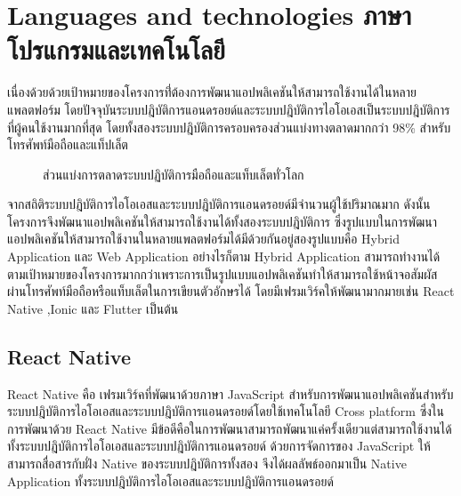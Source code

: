 \documentclass[12pt,oneside,openright,a4paper]{cpe-thai-project}
\begin{document}
\section{Languages and technologies  ภาษาโปรแกรมและเทคโนโลยี}
เนื่องด้วยด้วยเป้าหมายของโครงการที่่ต้องการพัฒนาแอปพลิเคชันให้สามารถใช้งานได้ในหลายแพลตฟอร์ม 
โดยปัจจุบันระบบปฎิบัติการแอนดรอยด์และระบบปฎิบัติการไอโอเอสเป็นระบบปฎิบัติการที่ผู้คนใช้งานมากที่สุด 
โดยทั้งสองระบบปฎิบัติการครอบครองส่วนแบ่งทางตลาดมากกว่า 98\%  สำหรับโทรศัพท์มือถือและแท็ปเล็ต
\begin{figure}[!ht]\centering
  \setlength{\fboxrule}{0.2mm} %
  \setlength{\fboxsep}{1cm}
  \caption{ส่วนแบ่งการตลาดระบบปฏิบัติการมือถือและแท็บเล็ตทั่วโลก}\label{fig:market}
\end{figure}
จากสถิติระบบปฎิบัติการไอโอเอสและระบบปฎิบัติการแอนดรอยด์มีจำนวนผู้ใช้ปริมาณมาก ดังนั้นโครงการจึงพัฒนาแอปพลิเคชันให้สามารถใช้งานได้ทั้งสองระบบปฎิบัติการ 
ซึ่งรูปแบบในการพัฒนาแอปพลิเคชันให้สามารถใช้งานในหลายแพลตฟอร์มได้มีด้วยกันอยู่สองรูปแบบคือ Hybrid Application และ Web Application อย่างไรก็ตาม Hybrid Application 
สามารถทำงานได้ตามเป้าหมายของโครงการมากกว่าเพราะการเป็นรูปแบบแอปพลิเคชันทำให้สามารถใช้หน้าจอสัมผัสผ่านโทรศัพท์มือถือหรือแท็บเล็ตในการเขียนตัวอักษรได้ โดยมีเฟรมเวิร์คให้พัฒนามากมายเช่น React Native ,Ionic และ Flutter เป็นต้น


\subsection{React Native}
React Native คือ เฟรมเวิร์คที่พัฒนาด้วยภาษา JavaScript สำหรับการพัฒนาแอปพลิเคชันสำหรับระบบปฎิบัติการไอโอเอสและระบบปฎิบัติการแอนดรอยด์โดยใช้เทคโนโลยี 
Cross platform ซึ่งในการพัฒนาด้วย React Native มีข้อดีคือในการพัฒนาสามารถพัฒนาแค่ครั้งเดียวแต่สามารถใช้งานได้ทั้งระบบปฎิบัติการไอโอเอสและระบบปฎิบัติการแอนดรอยด์ 
ด้วยการจัดการของ JavaScript ให้สามารถสื่อสารกับฝั่ง Native ของระบบปฎิบัติการทั้งสอง จึงได้ผลลัพธ์ออกมาเป็น Native Application ทั้งระบบปฎิบัติการไอโอเอสและระบบปฎิบัติการแอนดรอยด์ 
\end{document}
